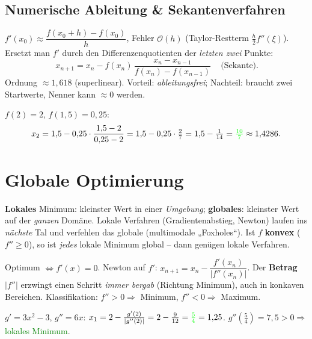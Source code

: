 \documentclass[a4paper,11pt]{article}
\newcommand{\f}[1]{\textcolor{green}{#1}}
\begin{document}
\subsection{Numerische Ableitung \& Sekantenverfahren}
\begin{formel}
$f'(x_0)\approx\dfrac{f(x_0+h)-f(x_0)}{h}$, Fehler $\mathcal O(h)$ (Taylor-Restterm $\tfrac h2 f''(\xi)$).
Ersetzt man $f'$ durch den Differenzenquotienten der \emph{letzten zwei} Punkte:
\[ \boxed{\,x_{n+1}=x_n-f(x_n)\,\dfrac{x_n-x_{n-1}}{f(x_n)-f(x_{n-1})}\,}\quad\text{(Sekante).} \]
Ordnung $\approx1{,}618$ (superlinear). Vorteil: \emph{ableitungsfrei}; Nachteil: braucht zwei
Startwerte, Nenner kann $\approx0$ werden.
\end{formel}

\begin{beispiel}[Ein Sekantenschritt, $f=x^2-2$, $x_0=2$, $x_1=1{,}5$]
$f(2)=2$, $f(1{,}5)=0{,}25$:
\[ x_2=1{,}5-0{,}25\cdot\frac{1{,}5-2}{0{,}25-2}=1{,}5-0{,}25\cdot\tfrac{2}{7}=1{,}5-\tfrac1{14}=\f{\tfrac{10}{7}}\approx1{,}4286. \]
\end{beispiel}

\section{Globale Optimierung}

\begin{formel}
\textbf{Lokales} Minimum: kleinster Wert in einer \emph{Umgebung}; \textbf{globales}: kleinster Wert auf
der \emph{ganzen} Domäne. Lokale Verfahren (Gradientenabstieg, Newton) laufen ins \emph{nächste} Tal und
verfehlen das globale (multimodale „Foxholes``). Ist $f$ \textbf{konvex} ($f''\ge0$), so ist
\emph{jedes} lokale Minimum global -- dann genügen lokale Verfahren.
\end{formel}

\begin{formel}
Optimum $\Leftrightarrow f'(x)=0$. Newton auf $f'$:
$x_{n+1}=x_n-\dfrac{f'(x_n)}{|f''(x_n)|}$. Der \textbf{Betrag} $|f''|$ erzwingt einen Schritt
\emph{immer bergab} (Richtung Minimum), auch in konkaven Bereichen. Klassifikation: $f''>0\Rightarrow$
Minimum, $f''<0\Rightarrow$ Maximum.
\end{formel}

\begin{beispiel}[$g=x^3-3x$, $x_0=2$]
$g'=3x^2-3$, $g''=6x$: $x_1=2-\frac{g'(2)}{|g''(2)|}=2-\frac{9}{12}=\f{\tfrac54}=1{,}25$.
$g''(\tfrac54)=7{,}5>0\Rightarrow$ \f{lokales Minimum}.
\end{beispiel}
\end{document}
